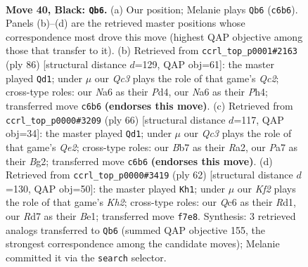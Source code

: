\documentclass[11pt]{article}
\begin{document}
\clearpage

\begin{figure}[p]\centering
\begin{subfigure}{0.46\textwidth}\centering
\resizebox{\linewidth}{!}{%
\newchessgame
\chessboard[
  setfen={7r/pb1r1k1p/n1qb2pP/1p1p1pP1/3P1P1K/1P2P3/4N3/R2Q1BNR b - - 27 40},
  showmover=false,
  pgfstyle=straightmove, color=movearrow, markmove={c6-b6}
]}
\caption{}
\end{subfigure}\hfill
\begin{subfigure}{0.46\textwidth}\centering
\resizebox{\linewidth}{!}{%
\newchessgame
\chessboard[
  setfen={6k1/1b3rn1/1p3qp1/p2p1p2/Pp1P2pP/3BP1P1/1PQB1P2/5RK1 w - - 16 44},
  showmover=false,
  pgfstyle=straightmove, color=movearrow, markmove={c2-d1}
]}
\caption{}
\end{subfigure}
\\[4pt]
\begin{subfigure}{0.46\textwidth}\centering
\resizebox{\linewidth}{!}{%
\newchessgame
\chessboard[
  setfen={6k1/2r1bpp1/1pq1nn1p/p2p4/P6P/1P2PNP1/R3QPB1/4B1K1 w - - 1 34},
  showmover=false,
  pgfstyle=straightmove, color=movearrow, markmove={e2-d1}
]}
\caption{}
\end{subfigure}\hfill
\begin{subfigure}{0.46\textwidth}\centering
\resizebox{\linewidth}{!}{%
\newchessgame
\chessboard[
  setfen={2rqr1k1/3n1p2/3ppnpb/p6p/2PP1P2/P2B1QNP/4R1PK/3RB3 w - - 4 32},
  showmover=false,
  pgfstyle=straightmove, color=movearrow, markmove={h2-h1}
]}
\caption{}
\end{subfigure}
\caption{\textbf{Move 40, Black: \texttt{Qb6}.} (a) Our position; Melanie plays \texttt{Qb6} (\texttt{c6b6}). Panels (b)--(d) are the retrieved master positions whose correspondence most drove this move (highest QAP objective among those that transfer to it). (b) Retrieved from \texttt{ccrl\_top\_p0001\#2163} (ply 86) [structural distance $d$=129, QAP obj=61]: the master played \texttt{Qd1}; under $\mu$ our \emph{Qc3} plays the role of that game's \emph{Qc2}; cross-type roles: our \emph{N}a6 as their \emph{P}d4, our \emph{N}a6 as their \emph{P}h4; transferred move \texttt{c6b6} \textbf{(endorses this move)}. (c) Retrieved from \texttt{ccrl\_top\_p0000\#3209} (ply 66) [structural distance $d$=117, QAP obj=34]: the master played \texttt{Qd1}; under $\mu$ our \emph{Qc3} plays the role of that game's \emph{Qe2}; cross-type roles: our \emph{B}b7 as their \emph{R}a2, our \emph{P}a7 as their \emph{B}g2; transferred move \texttt{c6b6} \textbf{(endorses this move)}. (d) Retrieved from \texttt{ccrl\_top\_p0000\#3419} (ply 62) [structural distance $d$=130, QAP obj=50]: the master played \texttt{Kh1}; under $\mu$ our \emph{Kf2} plays the role of that game's \emph{Kh2}; cross-type roles: our \emph{Q}c6 as their \emph{R}d1, our \emph{R}d7 as their \emph{B}e1; transferred move \texttt{f7e8}. Synthesis: 3 retrieved analogs transferred to \texttt{Qb6} (summed QAP objective 155, the strongest correspondence among the candidate moves); Melanie committed it via the \texttt{search} selector.}
\label{fig:thought-m79}
\end{figure}
\end{document}
